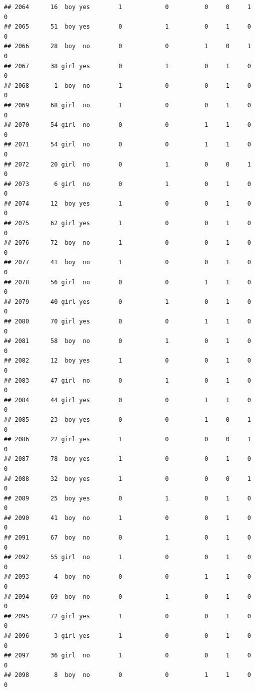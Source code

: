 \documentclass[man]{apa6}
\begin{document}
\begin{verbatim}
## 2064      16  boy yes        1            0          0     0     1     0
## 2065      51  boy yes        0            1          0     1     0     0
## 2066      28  boy  no        0            0          1     0     1     0
## 2067      38 girl yes        0            1          0     1     0     0
## 2068       1  boy  no        1            0          0     1     0     0
## 2069      68 girl  no        1            0          0     1     0     0
## 2070      54 girl  no        0            0          1     1     0     0
## 2071      54 girl  no        0            0          1     1     0     0
## 2072      20 girl  no        0            1          0     0     1     0
## 2073       6 girl  no        0            1          0     1     0     0
## 2074      12  boy yes        1            0          0     1     0     0
## 2075      62 girl yes        1            0          0     1     0     0
## 2076      72  boy  no        1            0          0     1     0     0
## 2077      41  boy  no        1            0          0     1     0     0
## 2078      56 girl  no        0            0          1     1     0     0
## 2079      40 girl yes        0            1          0     1     0     0
## 2080      70 girl yes        0            0          1     1     0     0
## 2081      58  boy  no        0            1          0     1     0     0
## 2082      12  boy yes        1            0          0     1     0     0
## 2083      47 girl  no        0            1          0     1     0     0
## 2084      44 girl yes        0            0          1     1     0     0
## 2085      23  boy yes        0            0          1     0     1     0
## 2086      22 girl yes        1            0          0     0     1     0
## 2087      78  boy yes        1            0          0     1     0     0
## 2088      32  boy yes        1            0          0     0     1     0
## 2089      25  boy yes        0            1          0     1     0     0
## 2090      41  boy  no        1            0          0     1     0     0
## 2091      67  boy  no        0            1          0     1     0     0
## 2092      55 girl  no        1            0          0     1     0     0
## 2093       4  boy  no        0            0          1     1     0     0
## 2094      69  boy  no        0            1          0     1     0     0
## 2095      72 girl yes        1            0          0     1     0     0
## 2096       3 girl yes        1            0          0     1     0     0
## 2097      36 girl  no        1            0          0     1     0     0
## 2098       8  boy  no        0            0          1     1     0     0

\end{verbatim}
\end{document}
